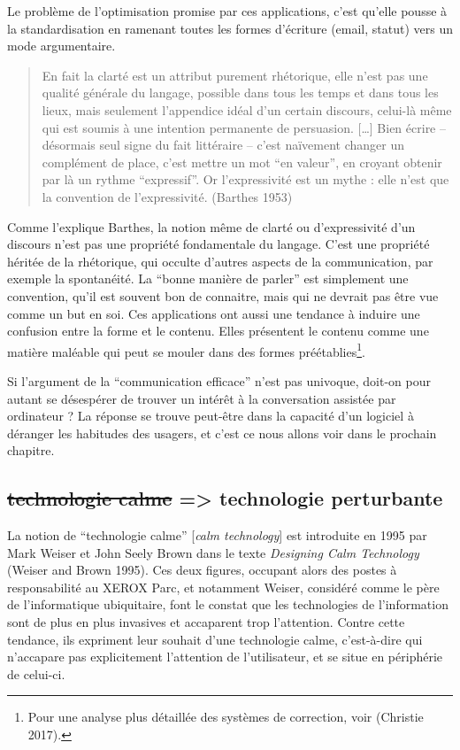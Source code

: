 \documentclass[]{article}
\begin{document}
Le problème de l'optimisation promise par ces applications, c'est
qu'elle pousse à la standardisation en ramenant toutes les formes
d'écriture (email, statut) vers un mode argumentaire.

\begin{quote}
En fait la clarté est un attribut purement rhétorique, elle n'est pas
une qualité générale du langage, possible dans tous les temps et dans
tous les lieux, mais seulement l'appendice idéal d'un certain discours,
celui-là même qui est soumis à une intention permanente de persuasion.
{[}\ldots{}{]} Bien écrire -- désormais seul signe du fait littéraire --
c'est naïvement changer un complément de place, c'est mettre un mot ``en
valeur'', en croyant obtenir par là un rythme ``expressif''. Or
l'expressivité est un mythe : elle n'est que la convention de
l'expressivité. (Barthes 1953)
\end{quote}

Comme l'explique Barthes, la notion même de clarté ou d'expressivité
d'un discours n'est pas une propriété fondamentale du langage. C'est une
propriété héritée de la rhétorique, qui occulte d'autres aspects de la
communication, par exemple la spontanéité. La ``bonne manière de
parler'' est simplement une convention, qu'il est souvent bon de
connaitre, mais qui ne devrait pas être vue comme un but en soi. Ces
applications ont aussi une tendance à induire une confusion entre la
forme et le contenu. Elles présentent le contenu comme une matière
maléable qui peut se mouler dans des formes préétablies\footnote{Pour
  une analyse plus détaillée des systèmes de correction, voir (Christie
  2017).}.

Si l'argument de la ``communication efficace'' n'est pas univoque,
doit-on pour autant se désespérer de trouver un intérêt à la
conversation assistée par ordinateur ? La réponse se trouve peut-être
dans la capacité d'un logiciel à déranger les habitudes des usagers, et
c'est ce nous allons voir dans le prochain chapitre.

\newpage

\hypertarget{technologie-calme-technologie-perturbante}{%
\subsection{\texorpdfstring{\sout{technologie calme} =\textgreater{}
technologie
perturbante}{technologie calme =\textgreater{} technologie perturbante}}\label{technologie-calme-technologie-perturbante}}

La notion de ``technologie calme'' {[}\emph{calm technology}{]} est
introduite en 1995 par Mark Weiser et John Seely Brown dans le texte
\emph{Designing Calm Technology} (Weiser and Brown 1995). Ces deux
figures, occupant alors des postes à responsabilité au XEROX Parc, et
notamment Weiser, considéré comme le père de l'informatique ubiquitaire,
font le constat que les technologies de l'information sont de plus en
plus invasives et accaparent trop l'attention. Contre cette tendance,
ils expriment leur souhait d'une technologie calme, c'est-à-dire qui
n'accapare pas explicitement l'attention de l'utilisateur, et se situe
en périphérie de celui-ci.
\end{document}
